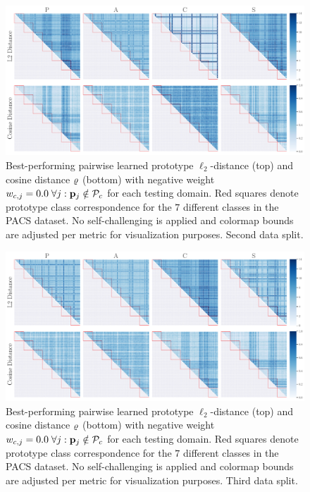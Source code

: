 
\begin{figure}[h]
    \centering
    \includegraphics[width=\textwidth]{Figures/Chapter4/2021-01-21-ProDropIncorrectWeight0.0SAVEResNet18oracle_validation_trial1.pdf}
    \caption[Second data split pairwise prototype distances with $w_{c,j} = 0.0$] {Best-performing pairwise learned prototype $\ell_2$-distance (top) and cosine distance $\varrho$ (bottom) with negative weight $w_{c,j} = 0.0\; \forall j: \mathbf{p}_{j} \notin \mathcal{P}_c$ for each testing domain. Red squares denote prototype class correspondence for the $7$ different classes in the PACS dataset. No self-challenging is applied and colormap bounds are adjusted per metric for visualization purposes. Second data split.}
    \label{fig:pw_distance_0.0_trial1}
\end{figure}

\begin{figure}[h]
    \centering
    \includegraphics[width=\textwidth]{Figures/Chapter4/2021-01-21-ProDropIncorrectWeight0.0SAVEResNet18oracle_validation_trial2.pdf}
    \caption[Third data split pairwise prototype distances with $w_{c,j} = 0.0$] {Best-performing pairwise learned prototype $\ell_2$-distance (top) and cosine distance $\varrho$ (bottom) with negative weight $w_{c,j} = 0.0\; \forall j: \mathbf{p}_{j} \notin \mathcal{P}_c$ for each testing domain. Red squares denote prototype class correspondence for the $7$ different classes in the PACS dataset. No self-challenging is applied and colormap bounds are adjusted per metric for visualization purposes. Third data split.}
    \label{fig:pw_distance_0.0_trial2}
\end{figure}

